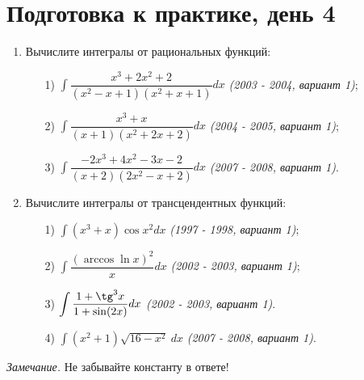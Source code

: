 \documentclass[a4paper,12pt]{article}
\begin{document}
\section*{Подготовка к практике, день 4}

\begin{enumerate}
     	\item Вычислите интегралы от рациональных функций:	
     	\begin{enumerate}
     		\item[1)] $\displaystyle \int \dfrac{x^3 + 2x^2 + 2}{(x^2 - x + 1)(x^2 + x + 1)} dx$ \textit{(2003 - 2004, вариант 1)};
     		\item[2)] $\displaystyle \int \dfrac{x^3 + x}{(x + 1)(x^2 + 2x + 2)} dx$ \textit{(2004 - 2005, вариант 1)};
     		\item[3)] $\displaystyle \int \dfrac{-2x^3 + 4x^2 -3x - 2}{(x + 2)(2x^2 -x + 2)} dx$ \textit{(2007 - 2008, вариант 1)}.
     	\end{enumerate} 
     	
     	\item Вычислите интегралы от трансцендентных функций:	
     	\begin{enumerate}
     		\item[1)] $\displaystyle \int (x^3 + x) \cos{x^2} dx$ \textit{(1997 - 1998, вариант 1)};
     		\item[2)] $\displaystyle \int \dfrac{(\arccos \ln x)^2}{x} dx$ \textit{(2002 - 2003, вариант 1)};
     		\item[3)] $\displaystyle \int \dfrac{1 + \tg^3 x}{1 + \sin(2x)} dx$ \textit{(2002 - 2003, вариант 1)}.
     		\item[4)] $\displaystyle \int (x^2 + 1) \sqrt{16 - x^2} \ dx$ \textit{(2007 - 2008, вариант 1)}. 
     	\end{enumerate}
     	     	
\end{enumerate}

\textit{Замечание.} Не забывайте константу в ответе! 
\end{document}
